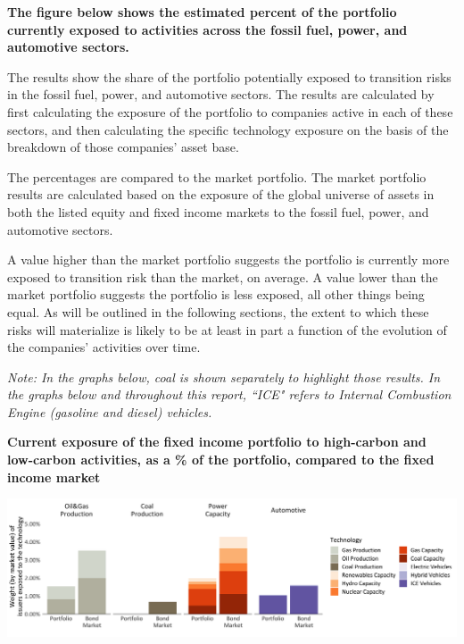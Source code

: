\documentclass[10pt,table,a4]{article}\usepackage[]{graphicx}\usepackage[]{color}
\begin{document}
	\begin{multicols}{2}
		
		\textbf{The figure below shows the estimated percent of the portfolio currently exposed to activities across the fossil fuel, power, and automotive sectors.}
		
		The results show the share of the portfolio potentially exposed to transition risks in the fossil fuel, power, and automotive sectors. The results are calculated by first calculating the exposure of the portfolio to companies active in each of these sectors, and then calculating the specific technology exposure on the basis of the breakdown of those companies' asset base.      
		
		The percentages are compared to the market portfolio. The market portfolio results are calculated based on the exposure of the global universe of assets in both the listed equity and fixed income markets to the fossil fuel, power, and automotive sectors.
		
		A value higher than the market portfolio suggests the portfolio is currently more exposed to transition risk than the market, on average. A value lower than the market portfolio suggests the portfolio is less exposed, all other things being equal. As will be outlined in the following sections, the extent to which these risks will materialize is likely to be at least in part a function of the evolution of the companies' activities over time. 
		
		\textit{Note: In the graphs below, coal is shown separately to highlight those results. In the graphs below and throughout this report, ``ICE" refers to Internal Combustion Engine (gasoline and diesel) vehicles.}
		
	\end{multicols}
	\textbf{Current exposure of the fixed income portfolio to high-carbon and low-carbon activities, as a \% of the portfolio, compared to the fixed income market}	
	
	\includegraphics[trim = {0 0cm 0 0cm},width=1\linewidth]{CAFigures/Fig03} 
	
\end{document}
